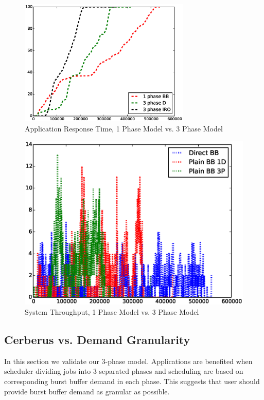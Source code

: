 \begin{figure}[!t]
\centering
\includegraphics[width=3.2in]{Draw3Pvs1P/1000jobs_3p_vs_1p_response}
\caption{Application Response Time, 1 Phase Model vs. 3 Phase Model}
\label{Fig:3Pvs1PResponseTime}
\end{figure}

\begin{figure}[!t]
\centering
\includegraphics[width=6.2in]{Draw3Pvs1P/1000jobs_3p_vs_1p_throughput}
\caption{System Throughput, 1 Phase Model vs. 3 Phase Model}
\label{Fig:3Pvs1PThroughput}
\end{figure}


\subsection{Cerberus vs. Demand Granularity}
In this section we validate our 3-phase model.
Applications are benefited when scheduler dividing jobs into 3 separated phases and 
scheduling are based on corresponding burst buffer demand in each phase.
This suggests that user should provide burst buffer demand as granular as possible.

